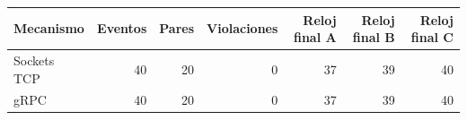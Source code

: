 \small\setlength{\tabcolsep}{4pt}
\begin{tabular}{lrrrrrr}
\toprule
Mecanismo & Eventos & Pares & Violaciones & Reloj final A & Reloj final B & Reloj final C \\
\midrule
Sockets TCP & 40 & 20 & 0 & 37 & 39 & 40 \\
gRPC & 40 & 20 & 0 & 37 & 39 & 40 \\
\bottomrule
\end{tabular}
